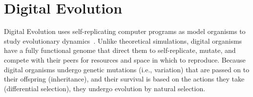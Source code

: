\documentclass[PhD]{msu-thesis}
\begin{document}







\section{Digital Evolution}

Digital Evolution uses self-replicating computer programs as model organisms to study evolutionary dynamics~\cite{mckinley_harnessing_2008}. Unlike theoretical simulations, digital organisms have a fully functional genome that direct them to self-replicate, mutate, and compete with their peers for resources and space in which to reproduce. Because digital organisms undergo genetic mutations (i.e., variation) that are passed on to their offspring (inheritance), and their survival is based on the actions they take (differential selection), they undergo evolution by natural selection. %
\end{document}
